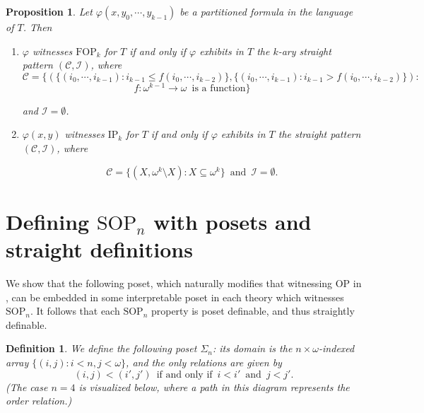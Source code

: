 \documentclass[10pt,a4paper]{amsart}
\newcommand{\calC}{\mathcal{C}}
\newcommand{\calI}{\mathcal{I}}
\newcommand{\SOP}{\text{SOP}}
\newcommand{\SOPn}{$\text{SOP}_n$}
\newcommand{\IFF}{\enspace\text{if and only if}\enspace}
\newcommand{\vphi}{\varphi}
\newtheorem{proposition}{Proposition}
\newtheorem{definition}{Definition}
\begin{document}
\begin{proposition}\label{higher arity straight pattern examples proposition}
    Let $\vphi(x,y_0,\dotsm, y_{k-1})$ be a partitioned formula in the language of $T$. Then
    \begin{enumerate}
        \item $\vphi$ witnesses $\mathrm{FOP}_k$ for $T$ if and only if $\vphi$ exhibits in $T$ the $k$-ary straight pattern $(\calC,\calI)$, where  
        \[\calC=\{(\{(i_0,\dotsm, i_{k-1})\colon i_{k-1}\leq f(i_0,\dotsm, i_{k-2})\},\{(i_0,\dotsm, i_{k-1})\colon i_{k-1}> f(i_0,\dotsm, i_{k-2})\})\colon\]
        \[ f\colon\omega^{k-1}\to\omega\enspace\text{is a function}\}\]
        
        and $\calI=\emptyset$.

        \item $\vphi(x,y)$ witnesses $\mathrm{IP}_k$ for $T$ if and only if $\vphi$ exhibits in $T$ the straight pattern $(\calC,\calI)$, where  
        
        \[\calC=\{(X,\omega^k\setminus X)\colon X\subseteq \omega^k\}\enspace\text{and}\enspace\calI=\emptyset.\]
        
    \end{enumerate}
\end{proposition}




\section{Defining $\SOP_n$ with posets and straight definitions}\label{New results on SOPn}

We show that the following poset, which naturally modifies that witnessing OP in \cite{garcia2022model}, can be embedded in some interpretable poset in each theory which witnesses \SOPn. It follows that each $\SOP_n$ property is poset definable, and thus straightly definable.

\begin{definition}
    We define the following poset $\Sigma_n$: its domain is the $n\times \omega$-indexed array $\{(i,j)\colon i<n, j<\omega\}$, and the only relations are given by \[(i,j)<(i', j') \IFF i<i' \enspace\text{and}\enspace j<j'.\] (The case $n=4$ is visualized below, where a path in this diagram represents the order relation.)
\end{definition}
\end{document}
